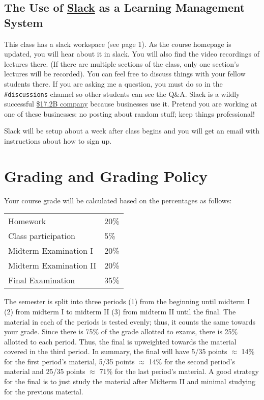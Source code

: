 \documentclass[12pt]{article}
\begin{document}
\subsection*{The Use of \href{slack.com}{Slack} as a Learning Management System}\label{sec:slack}

This class has a slack workspace (see page 1). As the course homepage is updated, you will hear about it in slack. You will also find the video recordings of lectures there. (If there are multiple sections of the class, only one section's lectures will be recorded). You can feel free to discuss things with your fellow students there. If you are asking me a question, you must do so in the \texttt{\#discussions} channel so other students can see the Q\&A. Slack is a wildly successful \href{https://www.google.com/search?tbm=fin&q=NYSE&q=WORK}{\$17.2B company} because businesses use it. Pretend you are working at one of these businesses: no posting about random stuff; keep things professional! 

Slack will be setup about a week after class begins and you will get an email with instructions about how to sign up.


\section*{Grading and Grading Policy}\label{sec:grading}

Your course grade will be calculated based on the percentages as follows: 

\begin{table}[h]
\centering
\begin{tabular}{l|l}
Homework & 20\% \\
Class participation & 5\% \\
Midterm Examination I & 20\%\\
Midterm Examination II & 20\%\\
Final Examination & 35\%
\end{tabular}
\end{table}
\FloatBarrier

The semester is split into three periods (1) from the beginning until midterm I (2) from midterm I to midterm II (3) from midterm II until the final. The material in each of the periods is tested evenly; thus, it counts the same towards your grade. Since there is 75\% of the grade allotted to exams, there is 25\% allotted to each period. Thus, the final is upweighted towards the material covered in the third period. In summary, the final will have 5/35 points $\approx$ 14\% for the first period's material, 5/35 points $\approx$ 14\% for the second period's material and 25/35 points $\approx$ 71\% for the last period's material. A good strategy for the final is to just study the material after Midterm II and minimal studying for the previous material.
\end{document}
